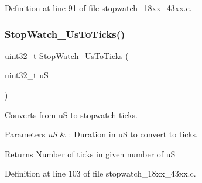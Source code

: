 Definition at line 91 of file stopwatch\+\_\+18xx\+\_\+43xx.\+c.

\mbox{\label{group___stop___watch_ga65ab3801fdb76aab8879a0698fc4df45}} 
\subsubsection{\texorpdfstring{Stop\+Watch\+\_\+\+Us\+To\+Ticks()}{StopWatch\_UsToTicks()}}
{\footnotesize\ttfamily uint32\+\_\+t Stop\+Watch\+\_\+\+Us\+To\+Ticks (\begin{DoxyParamCaption}\item[{uint32\+\_\+t}]{uS }\end{DoxyParamCaption})}



Converts from uS to stopwatch ticks. 


\begin{DoxyParams}{Parameters}
{\em uS} & \+: Duration in uS to convert to ticks. \\
\hline
\end{DoxyParams}
\begin{DoxyReturn}{Returns}
Number of ticks in given number of uS 
\end{DoxyReturn}


Definition at line 103 of file stopwatch\+\_\+18xx\+\_\+43xx.\+c.

